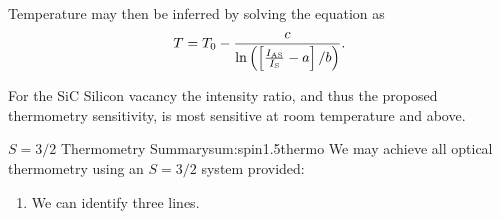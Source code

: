 Temperature may then be inferred by solving the equation as 
\begin{equation}
    T = T_0 - \frac{c}{\ln\left(\left[{\frac{I_{\ce{AS}}}{I_{\ce{S}}} - a}\right]/b\right)}.
    \label{eq:anti-stokes-solution}
\end{equation}

For the SiC Silicon vacancy the intensity ratio, and thus the proposed thermometry sensitivity, is most sensitive at room temperature and above. 





\begin{summary}{$S=3/2$ Thermometry Summary}{sum:spin1.5thermo}
	We may achieve all optical thermometry using an $S = 3/2$ system provided:
	\begin{enumerate}
		\item We can identify three lines.
	\end{enumerate}
\end{summary}

